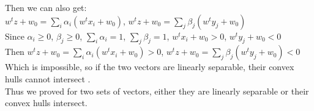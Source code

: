 \documentclass[11pt,a4paper,fleqn]{article}
\begin{document}
Then we can also get:\\
$w^tz+w_0 =\sum_i{\alpha_i}(w^t x_i+w_0)$, $w^tz+w_0 =\sum_j{\beta_j}(w^t y_j+w_0)$\\
Since $\alpha_i \ge 0$, $\beta_j \ge 0$, $\sum_i{\alpha_i}=1$, $\sum_j{\beta_j}=1$, $w^tx_i+w_0 > 0$, $w^ty_j+w_0 < 0$\\
Then $w^tz+w_0 =\sum_i{\alpha_i}(w^t x_i+w_0)>0$, $w^tz+w_0 =\sum_j{\beta_j}(w^t y_j+w_0)<0$\\
Which is impossible, so if the two vectors are linearly separable, their convex hulls cannot intersect .\\
Thus we proved for two sets of vectors, either they are linearly separable or their convex hulls intersect.\\
\end{document}
